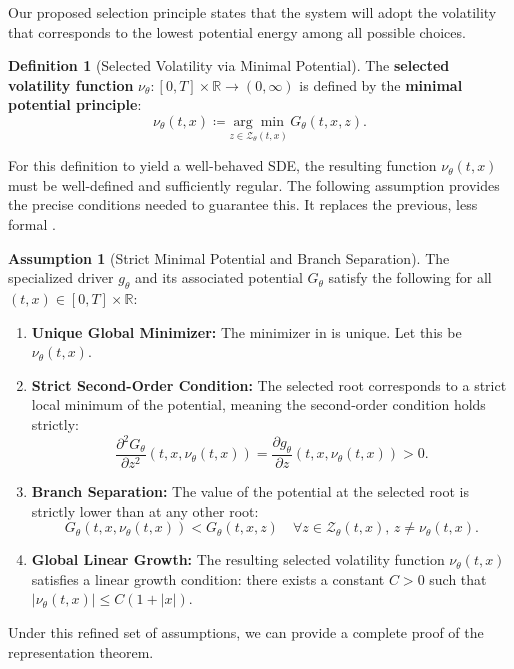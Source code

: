 \documentclass[qian]{imsart}
\newcommand{\R}{\mathbb{R}}
\theoremstyle{plain}
\theoremstyle{definition}
\newtheorem{definition}[theorem]{Definition}
\newtheorem{assumption}[theorem]{Assumption}
\begin{document}
Our proposed selection principle states that the system will adopt the volatility that corresponds to the lowest potential energy among all possible choices.

\begin{definition}[Selected Volatility via Minimal Potential]
\label{def:selected_vol}
The \textbf{selected volatility function} $\nu_\theta: [0,T] \times \R \to (0, \infty)$ is defined by the \textbf{minimal potential principle}:
\[ \nu_\theta(t,x) \coloneqq \underset{z \in \mathcal{Z}_\theta(t,x)}{\arg\min} \, G_\theta(t,x,z). \]
\end{definition}

For this definition to yield a well-behaved SDE, the resulting function $\nu_\theta(t,x)$ must be well-defined and sufficiently regular. The following assumption provides the precise conditions needed to guarantee this. It replaces the previous, less formal .

\begin{assumption}[Strict Minimal Potential and Branch Separation]
\label{ass:strict_minimizer}
The specialized driver $g_\theta$ and its associated potential $G_\theta$ satisfy the following for all $(t,x) \in [0,T] \times \R$:
\begin{enumerate}[label=(\roman*)]
    \item \textbf{Unique Global Minimizer:} The minimizer in  is unique. Let this be $\nu_\theta(t,x)$.
    \item \textbf{Strict Second-Order Condition:} The selected root corresponds to a strict local minimum of the potential, meaning the second-order condition holds strictly:
    \[ \frac{\partial^2 G_\theta}{\partial z^2}(t,x,\nu_\theta(t,x)) = \frac{\partial g_\theta}{\partial z}(t,x,\nu_\theta(t,x)) > 0. \]
    \item \textbf{Branch Separation:} The value of the potential at the selected root is strictly lower than at any other root:
    \[ G_\theta(t,x, \nu_\theta(t,x)) < G_\theta(t,x, z) \quad \forall z \in \mathcal{Z}_\theta(t,x), \, z \neq \nu_\theta(t,x). \]
    \item \textbf{Global Linear Growth:} The resulting selected volatility function $\nu_\theta(t,x)$ satisfies a linear growth condition: there exists a constant $C>0$ such that $|\nu_\theta(t,x)| \le C(1+|x|)$.
\end{enumerate}
\end{assumption}

Under this refined set of assumptions, we can provide a complete proof of the representation theorem.
\end{document}
